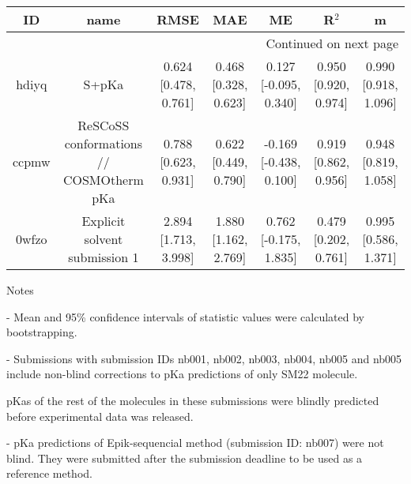 \documentclass{article}
\begin{document}
\begin{center}
\begin{longtable}{|ccccccc|}
\toprule
    ID &                                     name &                  RMSE &                   MAE &                      ME &                 R$^2$ &                     m \\
\midrule
\endhead
\midrule
\multicolumn{7}{r}{{Continued on next page}} \\
\midrule
\endfoot

\bottomrule
\endlastfoot
 hdiyq &                                    S+pKa &  0.624 [0.478, 0.761] &  0.468 [0.328, 0.623] &   0.127 [-0.095, 0.340] &  0.950 [0.920, 0.974] &  0.990 [0.918, 1.096] \\
 ccpmw &  ReSCoSS conformations // COSMOtherm pKa &  0.788 [0.623, 0.931] &  0.622 [0.449, 0.790] &  -0.169 [-0.438, 0.100] &  0.919 [0.862, 0.956] &  0.948 [0.819, 1.058] \\
 0wfzo &            Explicit solvent submission 1 &  2.894 [1.713, 3.998] &  1.880 [1.162, 2.769] &   0.762 [-0.175, 1.835] &  0.479 [0.202, 0.761] &  0.995 [0.586, 1.371] \\
\end{longtable}
\end{center}

Notes

- Mean and 95\% confidence intervals of statistic values were calculated by bootstrapping.

- Submissions with submission IDs nb001, nb002, nb003, nb004, nb005 and nb005 include non-blind corrections to pKa predictions of only SM22 molecule.

pKas of the rest of the molecules in these submissions were blindly predicted before experimental data was released.

- pKa predictions of Epik-sequencial method (submission ID: nb007) were not blind. They were submitted after the submission deadline to be used as a reference method.
\end{document}
